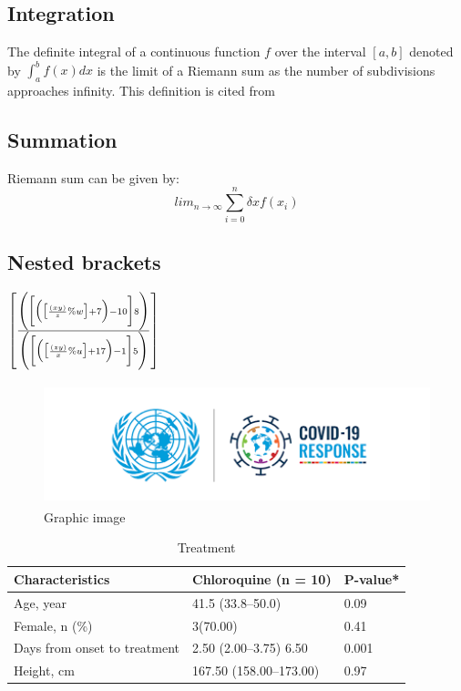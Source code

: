 \documentclass{article}
\begin{document}
\subsection{Integration}
The definite integral of a continuous function $f$ over the interval $[a,b]$ denoted by $\int_a^bf(x)dx$ is the limit of a Riemann sum as the number of subdivisions approaches infinity. This definition is cited from\cite{ghorpade2018course}
\subsection{Summation}
Riemann sum can be given by:
\[\textit{lim}_{n\to\infty}\sum_{i=0}^n\delta xf(x_i)\]
\subsection{Nested brackets}
\(\left[\frac{\Biggl(\biggl[\Bigl(\bigl[\frac{(xy)}{z}\%w\bigr]+7\Bigr)- 10\biggl]8\Biggl)}{\Biggl(\biggl[\Bigl(\bigl[\frac{(zy)}{x}\%u\bigr]+17\Bigr)- 1\biggl]5\Biggl)}\right]\)
\newpage
\begin{figure}
\includegraphics[height=3.5cm]{covid.png}
\caption{Graphic image}
\end{figure}
\begin{table}
\begin{tabular}{|l|l|l|}
\hline
Characteristics&Chloroquine (n = 10)&P-value*\\\hline
\hline
Age, year&41.5 (33.8–50.0)&0.09\\\hline
Female, n (\%)&3(70.00)&0.41\\\hline
Days from onset to treatment&2.50 (2.00–3.75) 6.50&0.001\\\hline
Height, cm&167.50 (158.00–173.00)&0.97\\\hline
\end{tabular}
\caption{Treatment}
\end{table}
\end{document}

